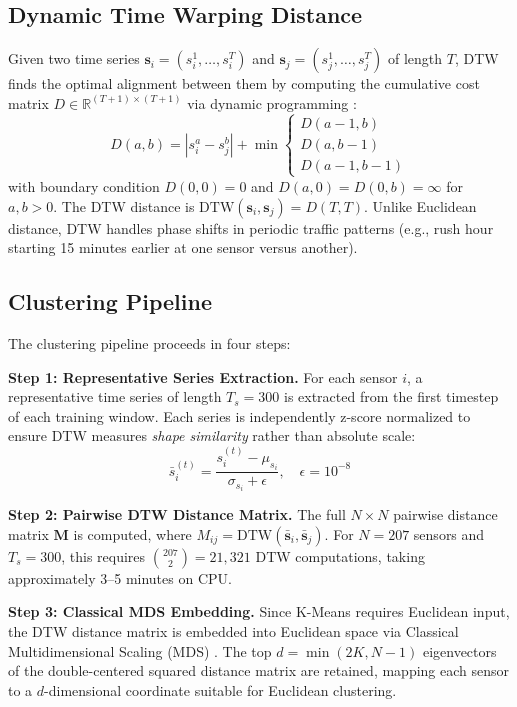\subsection{Dynamic Time Warping Distance}
Given two time series $\mathbf{s}_i = (s_i^1, \dots, s_i^T)$ and $\mathbf{s}_j = (s_j^1, \dots, s_j^T)$ of length $T$, DTW finds the optimal alignment between them by computing the cumulative cost matrix $D \in \mathbb{R}^{(T+1) \times (T+1)}$ via dynamic programming \cite{sakoe1978}:
\begin{equation}
\label{eq:dtw}
D(a, b) = |s_i^a - s_j^b| + \min\begin{cases} D(a-1, b) \\ D(a, b-1) \\ D(a-1, b-1) \end{cases}
\end{equation}
with boundary condition $D(0, 0) = 0$ and $D(a, 0) = D(0, b) = \infty$ for $a, b > 0$. The DTW distance is $\text{DTW}(\mathbf{s}_i, \mathbf{s}_j) = D(T, T)$. Unlike Euclidean distance, DTW handles phase shifts in periodic traffic patterns (e.g., rush hour starting 15 minutes earlier at one sensor versus another).

\subsection{Clustering Pipeline}
The clustering pipeline proceeds in four steps:

\textbf{Step 1: Representative Series Extraction.} For each sensor $i$, a representative time series of length $T_s = 300$ is extracted from the first timestep of each training window. Each series is independently z-score normalized to ensure DTW measures \textit{shape similarity} rather than absolute scale:
\begin{equation}
\bar{s}_i^{(t)} = \frac{s_i^{(t)} - \mu_{s_i}}{\sigma_{s_i} + \epsilon}, \quad \epsilon = 10^{-8}
\end{equation}

\textbf{Step 2: Pairwise DTW Distance Matrix.} The full $N \times N$ pairwise distance matrix $\mathbf{M}$ is computed, where $M_{ij} = \text{DTW}(\bar{\mathbf{s}}_i, \bar{\mathbf{s}}_j)$. For $N = 207$ sensors and $T_s = 300$, this requires $\binom{207}{2} = 21{,}321$ DTW computations, taking approximately 3--5 minutes on CPU.

\textbf{Step 3: Classical MDS Embedding.} Since K-Means requires Euclidean input, the DTW distance matrix is embedded into Euclidean space via Classical Multidimensional Scaling (MDS) \cite{cox2000}. The top $d = \min(2K, N-1)$ eigenvectors of the double-centered squared distance matrix are retained, mapping each sensor to a $d$-dimensional coordinate suitable for Euclidean clustering.

